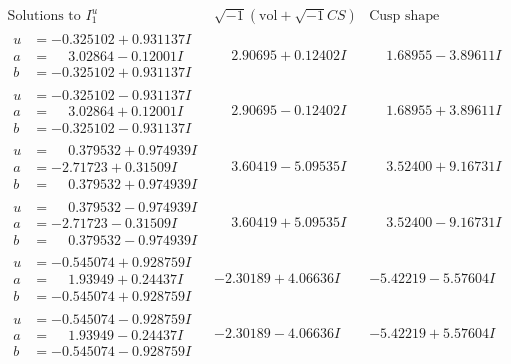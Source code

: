 \documentclass[1p]{elsarticle_modified}
\theoremstyle{definition}
\newcommand{\I}{\sqrt{-1}}
\begin{document}
$$\begin{array}{c|c|c}  
\text{Solutions to }I^u_{1}& \I (\text{vol} + \sqrt{-1}CS) & \text{Cusp shape}\\
 \hline 
\begin{aligned}
u &= -0.325102 + 0.931137 I \\
a &= \phantom{-}3.02864 - 0.12001 I \\
b &= -0.325102 + 0.931137 I\end{aligned}
 & \phantom{-}2.90695 + 0.12402 I & \phantom{-}1.68955 - 3.89611 I \\ \hline\begin{aligned}
u &= -0.325102 - 0.931137 I \\
a &= \phantom{-}3.02864 + 0.12001 I \\
b &= -0.325102 - 0.931137 I\end{aligned}
 & \phantom{-}2.90695 - 0.12402 I & \phantom{-}1.68955 + 3.89611 I \\ \hline\begin{aligned}
u &= \phantom{-}0.379532 + 0.974939 I \\
a &= -2.71723 + 0.31509 I \\
b &= \phantom{-}0.379532 + 0.974939 I\end{aligned}
 & \phantom{-}3.60419 - 5.09535 I & \phantom{-}3.52400 + 9.16731 I \\ \hline\begin{aligned}
u &= \phantom{-}0.379532 - 0.974939 I \\
a &= -2.71723 - 0.31509 I \\
b &= \phantom{-}0.379532 - 0.974939 I\end{aligned}
 & \phantom{-}3.60419 + 5.09535 I & \phantom{-}3.52400 - 9.16731 I \\ \hline\begin{aligned}
u &= -0.545074 + 0.928759 I \\
a &= \phantom{-}1.93949 + 0.24437 I \\
b &= -0.545074 + 0.928759 I\end{aligned}
 & -2.30189 + 4.06636 I & -5.42219 - 5.57604 I \\ \hline\begin{aligned}
u &= -0.545074 - 0.928759 I \\
a &= \phantom{-}1.93949 - 0.24437 I \\
b &= -0.545074 - 0.928759 I\end{aligned}
 & -2.30189 - 4.06636 I & -5.42219 + 5.57604 I \\ \hline\begin{aligned}

\end{aligned}
\end{array}$$
\end{document}
